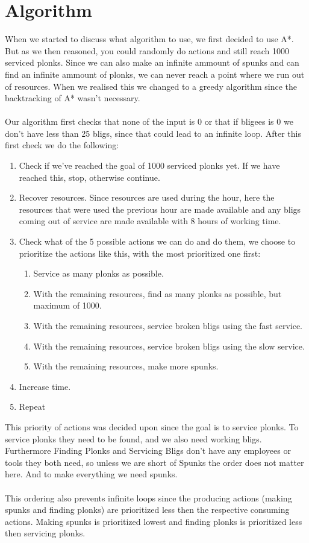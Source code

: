 \documentclass{article}
\begin{document}
\section*{Algorithm}
When we started to discuss what algorithm to use, we first decided to use A*. But as we then reasoned, you could randomly do actions and still reach 1000 serviced plonks. Since we can also make an infinite ammount of spunks and can find an infinite ammount of plonks, we can never reach a point where we run out of resources. When we realised this we changed to a greedy algorithm since the backtracking of A* wasn't necessary.
\\ \\
Our algorithm first checks that none of the input is 0 or that if bligees is 0 we don't have less than 25 bligs, since that could lead to an infinite loop. After this first check we do the following:
\begin{enumerate}
	\item Check if we've reached the goal of 1000 serviced plonks yet. If we have reached this, stop, otherwise continue.
	\item Recover resources. Since resources are used during the hour, here the resources that were used the previous hour are made available and any bligs coming out of service are made available with 8 hours of working time.
	\item Check what of the 5 possible actions we can do and do them, we choose to prioritize the actions like this, with the most prioritized one first:
	\begin{enumerate}
		\item Service as many plonks as possible.
		\item With the remaining resources, find as many plonks as possible, but maximum of 1000.
		\item With the remaining resources, service broken bligs using the fast service.
		\item With the remaining resources, service broken bligs using the slow service.
		\item With the remaining resources, make more spunks.
	\end{enumerate}
	\item Increase time.
	\item Repeat
\end{enumerate}

This priority of actions was decided upon since the goal is to service plonks. To service plonks they need to be found, and we also need working bligs. Furthermore Finding Plonks and Servicing Bligs don't have any employees or tools they both need, so unless we are short of Spunks the order does not matter here. And to make everything we need spunks. 
\\ \\
This ordering also prevents infinite loops since the producing actions (making spunks and finding plonks) are prioritized less then the respective consuming actions. Making spunks is prioritized lowest and finding plonks is prioritized less then servicing plonks.
\end{document}
